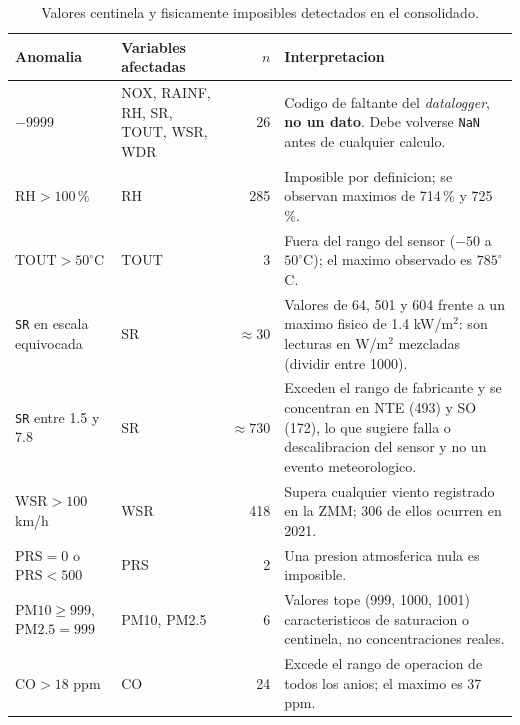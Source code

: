 \begin{table}[pos=t]
  \centering
  \caption{Valores centinela y fisicamente imposibles detectados en el
    consolidado.}
  \label{tab:dic-anomalias}
  \small
  \begin{tabular}{p{3cm}p{2.6cm}rp{7cm}}
    \toprule
    Anomalia & Variables afectadas & $n$ & Interpretacion \\
    \midrule
    $-9999$
      & NOX, RAINF, RH, SR, TOUT, WSR, WDR & 26
      & Codigo de faltante del \emph{datalogger}, \textbf{no un dato}. Debe volverse \texttt{NaN} antes de cualquier calculo. \\
    \addlinespace
    $\mathrm{RH} > 100$\,\% & RH & 285
      & Imposible por definicion; se observan maximos de 714\,\% y 725\,\%. \\
    \addlinespace
    $\mathrm{TOUT} > 50^{\circ}$C & TOUT & 3
      & Fuera del rango del sensor ($-50$ a $50^{\circ}$C); el maximo observado es $785^{\circ}$C. \\
    \addlinespace
    \texttt{SR} en escala equivocada & SR & $\approx 30$
      & Valores de 64, 501 y 604 frente a un maximo fisico de 1.4 kW/m$^2$: son lecturas en W/m$^2$ mezcladas (dividir entre 1000). \\
    \addlinespace
    \texttt{SR} entre 1.5 y 7.8 & SR & $\approx 730$
      & Exceden el rango de fabricante y se concentran en NTE (493) y SO (172), lo que sugiere falla o descalibracion del sensor y no un evento meteorologico. \\
    \addlinespace
    $\mathrm{WSR} > 100$ km/h & WSR & 418
      & Supera cualquier viento registrado en la ZMM; 306 de ellos ocurren en 2021. \\
    \addlinespace
    $\mathrm{PRS} = 0$ o $\mathrm{PRS} < 500$ & PRS & 2
      & Una presion atmosferica nula es imposible. \\
    \addlinespace
    $\mathrm{PM10} \geq 999$, $\mathrm{PM2.5} = 999$ & PM10, PM2.5 & 6
      & Valores tope (999, 1000, 1001) caracteristicos de saturacion o centinela, no concentraciones reales. \\
    \addlinespace
    $\mathrm{CO} > 18$ ppm & CO & 24
      & Excede el rango de operacion de todos los anios; el maximo es 37 ppm. \\
    \bottomrule
  \end{tabular}
\end{table}

